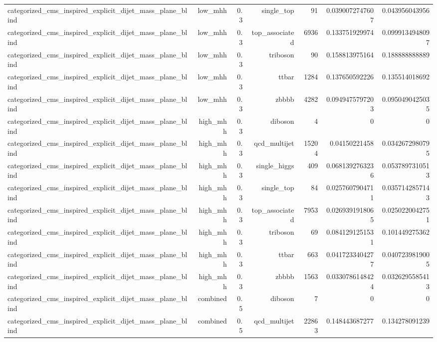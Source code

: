 \begin{table}[htbp]
{\begin{tabular}{lrrrrrr}
categorized\_cms\_inspired\_explicit\_dijet\_mass\_plane\_blind & low\_mhh & 0.3 & single\_top & 91 & 0.0390072747607 & 0.043956043956 \\
categorized\_cms\_inspired\_explicit\_dijet\_mass\_plane\_blind & low\_mhh & 0.3 & top\_associated & 6936 & 0.133751929974 & 0.0999134948097 \\
categorized\_cms\_inspired\_explicit\_dijet\_mass\_plane\_blind & low\_mhh & 0.3 & triboson & 90 & 0.158813975164 & 0.188888888889 \\
categorized\_cms\_inspired\_explicit\_dijet\_mass\_plane\_blind & low\_mhh & 0.3 & ttbar & 1284 & 0.137650592226 & 0.135514018692 \\
categorized\_cms\_inspired\_explicit\_dijet\_mass\_plane\_blind & low\_mhh & 0.3 & zbbbb & 4282 & 0.0949475797203 & 0.0950490425035 \\
categorized\_cms\_inspired\_explicit\_dijet\_mass\_plane\_blind & high\_mhh & 0.3 & diboson & 4 & 0 & 0 \\
categorized\_cms\_inspired\_explicit\_dijet\_mass\_plane\_blind & high\_mhh & 0.3 & qcd\_multijet & 15204 & 0.04150221458 & 0.0342672980795 \\
categorized\_cms\_inspired\_explicit\_dijet\_mass\_plane\_blind & high\_mhh & 0.3 & single\_higgs & 409 & 0.0681392763236 & 0.0537897310513 \\
categorized\_cms\_inspired\_explicit\_dijet\_mass\_plane\_blind & high\_mhh & 0.3 & single\_top & 84 & 0.0257607904711 & 0.0357142857143 \\
categorized\_cms\_inspired\_explicit\_dijet\_mass\_plane\_blind & high\_mhh & 0.3 & top\_associated & 7953 & 0.0269391918065 & 0.0250220042751 \\
categorized\_cms\_inspired\_explicit\_dijet\_mass\_plane\_blind & high\_mhh & 0.3 & triboson & 69 & 0.0841291251531 & 0.101449275362 \\
categorized\_cms\_inspired\_explicit\_dijet\_mass\_plane\_blind & high\_mhh & 0.3 & ttbar & 663 & 0.0417233404277 & 0.0407239819005 \\
categorized\_cms\_inspired\_explicit\_dijet\_mass\_plane\_blind & high\_mhh & 0.3 & zbbbb & 1563 & 0.0330786148424 & 0.0326295585413 \\
categorized\_cms\_inspired\_explicit\_dijet\_mass\_plane\_blind & combined & 0.5 & diboson & 7 & 0 & 0 \\
categorized\_cms\_inspired\_explicit\_dijet\_mass\_plane\_blind & combined & 0.5 & qcd\_multijet & 22863 & 0.148443687277 & 0.134278091239 \\

\end{tabular}}
\end{table}
